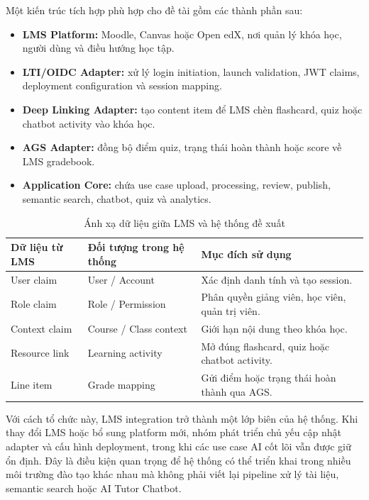 Một kiến trúc tích hợp phù hợp cho đề tài gồm các thành phần sau:

\begin{itemize}
    \item \textbf{LMS Platform:} Moodle, Canvas hoặc Open edX, nơi quản lý khóa
          học, người dùng và điều hướng học tập.
    \item \textbf{LTI/OIDC Adapter:} xử lý login initiation, launch validation,
          JWT claims, deployment configuration và session mapping.
    \item \textbf{Deep Linking Adapter:} tạo content item để LMS chèn flashcard,
          quiz hoặc chatbot activity vào khóa học.
    \item \textbf{AGS Adapter:} đồng bộ điểm quiz, trạng thái hoàn thành hoặc
          score về LMS gradebook.
    \item \textbf{Application Core:} chứa use case upload, processing, review,
          publish, semantic search, chatbot, quiz và analytics.
\end{itemize}

\begin{table}[H]
    \centering
    \caption{Ánh xạ dữ liệu giữa LMS và hệ thống đề xuất}
    \label{tab:lms-data-mapping}
    \begin{tabular}{p{4cm}p{4.2cm}p{5.3cm}}
        \toprule
        \textbf{Dữ liệu từ LMS} & \textbf{Đối tượng trong hệ thống} & \textbf{Mục đích sử dụng} \\
        \midrule
        User claim & User / Account & Xác định danh tính và tạo session. \\
        Role claim & Role / Permission & Phân quyền giảng viên, học viên, quản trị viên. \\
        Context claim & Course / Class context & Giới hạn nội dung theo khóa học. \\
        Resource link & Learning activity & Mở đúng flashcard, quiz hoặc chatbot activity. \\
        Line item & Grade mapping & Gửi điểm hoặc trạng thái hoàn thành qua AGS. \\
        \bottomrule
    \end{tabular}
\end{table}

Với cách tổ chức này, LMS integration trở thành một lớp biên của hệ thống. Khi
thay đổi LMS hoặc bổ sung platform mới, nhóm phát triển chủ yếu cập nhật adapter
và cấu hình deployment, trong khi các use case AI cốt lõi vẫn được giữ ổn định.
Đây là điều kiện quan trọng để hệ thống có thể triển khai trong nhiều môi trường
đào tạo khác nhau mà không phải viết lại pipeline xử lý tài liệu, semantic search
hoặc AI Tutor Chatbot.

